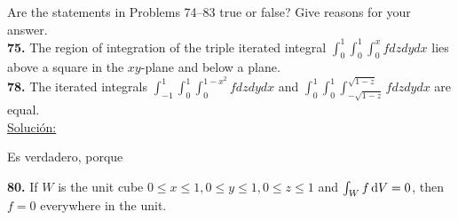 \documentclass[11pt]{report}
\newcommand{\s}{\underline{Soluci\'{o}n:}}
\begin{document}
Are the statements in Problems 74–83 true or false? Give reasons for your answer. \\

\textbf{75.} The region of integration of the triple iterated integral
$\int_0^1 \int_0^1 \int_0^x f dz dy dx $ lies above a square in the $xy$-plane
and below a plane. \\

\textbf{78.} The iterated integrals $\int_{-1}^1 \int_0^1 \int_0^{1-x^2} f dz dy dx $
and $\int_0^1 \int_0^1 \int_{-\sqrt{1-z}}^{\sqrt{1-z}} f dz dy dx $ are equal. \\

\s

Es verdadero, porque


\textbf{80.} If $W$ is the unit cube $0 \leq x \leq 1, 0 \leq y \leq 1, 0 \leq z \leq 1$
and $ \int _W f \, \text dV = 0$, then $f = 0$ everywhere in the unit. \\
\end{document}
